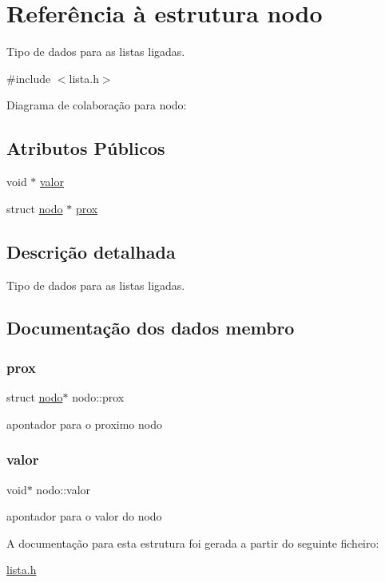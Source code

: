 \hypertarget{structnodo}{}\section{Referência à estrutura nodo}
\label{structnodo}


Tipo de dados para as listas ligadas.  




{\ttfamily \#include $<$lista.\+h$>$}



Diagrama de colaboração para nodo\+:
\subsection*{Atributos Públicos}
\begin{DoxyCompactItemize}
\item 
void $\ast$ \hyperlink{structnodo_ab63adcdb83ea1fdcf4fa10f3cafc4a6a}{valor}
\item 
struct \hyperlink{structnodo}{nodo} $\ast$ \hyperlink{structnodo_a086547621a7da23b916bbe26e0855308}{prox}
\end{DoxyCompactItemize}


\subsection{Descrição detalhada}
Tipo de dados para as listas ligadas. 

\subsection{Documentação dos dados membro}
\mbox{\label{structnodo_a086547621a7da23b916bbe26e0855308}} 
\subsubsection{\texorpdfstring{prox}{prox}}
{\footnotesize\ttfamily struct \hyperlink{structnodo}{nodo}$\ast$ nodo\+::prox}

apontador para o proximo nodo \mbox{\label{structnodo_ab63adcdb83ea1fdcf4fa10f3cafc4a6a}} 
\subsubsection{\texorpdfstring{valor}{valor}}
{\footnotesize\ttfamily void$\ast$ nodo\+::valor}

apontador para o valor do nodo 

A documentação para esta estrutura foi gerada a partir do seguinte ficheiro\+:\begin{DoxyCompactItemize}
\item 
\hyperlink{lista_8h}{lista.\+h}\end{DoxyCompactItemize}
